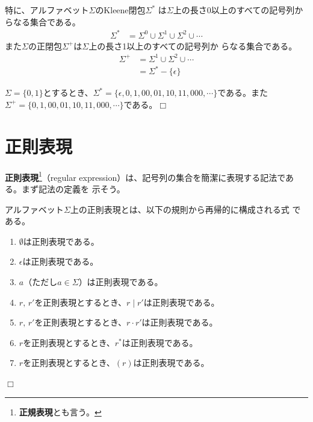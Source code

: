 特に、アルファベット$\Sigma$のKleene閉包$\Sigma^\ast$
は$\Sigma$上の長さ0以上のすべての記号列からなる集合である。
\begin{align*}
 \Sigma^* & = \Sigma^0 \cup \Sigma^1 \cup \Sigma^2 \cup \cdots
\end{align*}
また$\Sigma$の正閉包$\Sigma^+$は$\Sigma$上の長さ1以上のすべての記号列か
らなる集合である。
\begin{align*}
 \Sigma^+ & = \Sigma^1 \cup \Sigma^2 \cup \cdots \\
          & = \Sigma^* - \{\epsilon\}
\end{align*}

\begin{example}
 $\Sigma = \{0, 1\}$とするとき、$\Sigma^\ast = \{\epsilon, 0, 1, 00, 01,
 10, 11, 000, \cdots\}$である。また$\Sigma^+ = \{0, 1, 00, 01, 10, 11,
 000, \cdots\}$である。$\Box$
\end{example}

\section{正則表現}

{\bfseries 正則表現}\footnote{{\bfseries 正規表現}とも言う。}（regular
expression）は、記号列の集合を簡潔に表現する記法である。まず記法の定義を
示そう。

\begin{definition}
 \label{def:regexp}
 アルファベット$\Sigma$上の正則表現とは、以下の規則から再帰的に構成される式
 である。
 \begin{enumerate}
  \item $\emptyset$は正則表現である。
  \item $\epsilon$は正則表現である。
  \item $a$（ただし$a \in \Sigma$）は正則表現である。
  \item $r,\, r'$を正則表現とするとき、$r \mid r'$は正則表現である。
	\label{182200_29Mar06}
  \item $r,\, r'$を正則表現とするとき、$r \cdot r'$は正則表現である。
	\label{182346_29Mar06}
  \item $r$を正則表現とするとき、$r^\ast$は正則表現である。
	\label{182310_29Mar06}
  \item $r$を正則表現とするとき、$(r)$は正則表現である。
	\label{182237_29Mar06}
 \end{enumerate}$\Box$
\end{definition}

